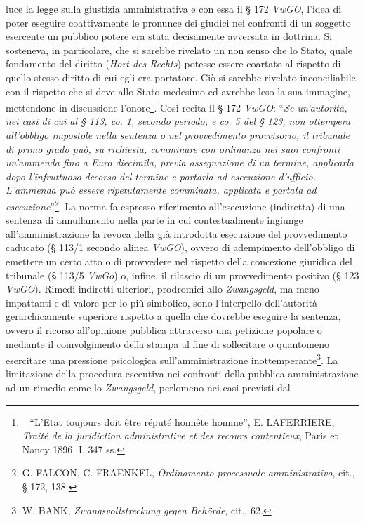 \documentclass[12pt,it,a4paper,]{report}
\begin{document}
luce la legge sulla giustizia amministrativa e con essa il § 172
\emph{VwGO}, l'idea di poter eseguire coattivamente le pronunce dei
giudici nei confronti di un soggetto esercente un pubblico potere era
stata decisamente avversata in dottrina. Si sosteneva, in particolare,
che si sarebbe rivelato un non senso che lo Stato, quale fondamento del
diritto (\emph{Hort des Rechts}) potesse essere coartato al rispetto di
quello stesso diritto di cui egli era portatore. Ciò si sarebbe rivelato
inconciliabile con il rispetto che si deve allo Stato medesimo ed
avrebbe leso la sua immagine, mettendone in discussione
l'onore\footnote{\_``L'Etat toujours doit être réputé honnête homme'',
  E. LAFERRIERE, \emph{Traité de la juridiction administrative et des
  recours contentieux}, Paris et Nancy 1896, I, 347 ss.}. Così recita il
§ 172 \emph{VwGO}: ``\emph{Se un'autorità, nei casi di cui al § 113, co.
1, secondo periodo, e co. 5 del § 123, non ottempera all'obbligo
impostole nella sentenza o nel provvedimento provvisorio, il tribunale
di primo grado può, su richiesta, comminare con ordinanza nei suoi
confronti un'ammenda fino a Euro diecimila, previa assegnazione di un
termine, applicarla dopo l'infruttuoso decorso del termine e portarla ad
esecuzione d'ufficio. L'ammenda può essere ripetutamente comminata,
applicata e portata ad esecuzione}''\footnote{G. FALCON, C. FRAENKEL,
  \emph{Ordinamento processuale amministrativo}, cit., § 172, 138.}. La
norma fa espresso riferimento all'esecuzione (indiretta) di una sentenza
di annullamento nella parte in cui contestualmente ingiunge
all'amministrazione la revoca della già introdotta esecuzione del
provvedimento caducato (§ 113/1 secondo alinea \emph{VwGO}), ovvero di
adempimento dell'obbligo di emettere un certo atto o di provvedere nel
rispetto della concezione giuridica del tribunale (§ 113/5 \emph{VwGo})
o, infine, il rilascio di un provvedimento positivo (§ 123 \emph{VwGO}).
Rimedi indiretti ulteriori, prodromici allo \emph{Zwangsgeld}, ma meno
impattanti e di valore per lo più simbolico, sono l'interpello
dell'autorità gerarchicamente superiore rispetto a quella che dovrebbe
eseguire la sentenza, ovvero il ricorso all'opinione pubblica attraverso
una petizione popolare o mediante il coinvolgimento della stampa al fine
di sollecitare o quantomeno esercitare una pressione psicologica
sull'amministrazione inottemperante\footnote{W. BANK,
  \emph{Zwangsvollstreckung gegen Behörde}, cit., 62.}. La limitazione
della procedura esecutiva nei confronti della pubblica amministrazione
ad un rimedio come lo \emph{Zwangsgeld}, perlomeno nei casi previsti dal
\end{document}
